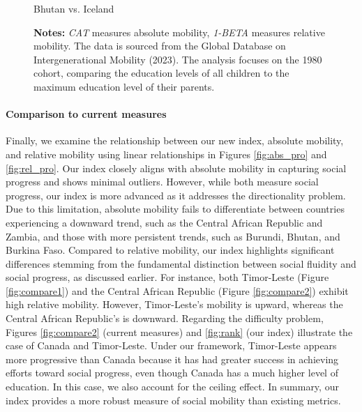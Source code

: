 \begin{figure}[H]
    \centering
    \caption{Bhutan vs. Iceland}
    \label{fig:compare3}
    \captionsetup{font=footnotesize}
    \caption*{\textbf{Notes:} \textit{CAT} measures absolute mobility, \textit{1-BETA} measures relative mobility. The data is sourced from the Global Database on Intergenerational Mobility (2023). The analysis focuses on the 1980 cohort, comparing the education levels of all children to the maximum education level of their parents.}
\end{figure}

\paragraph{Comparison to current measures}
Finally, we examine the relationship between our new index, absolute mobility, and relative mobility using linear relationships in Figures \ref{fig:abs_pro} and \ref{fig:rel_pro}. Our index closely aligns with absolute mobility in capturing social progress and shows minimal outliers. However, while both measure social progress, our index is more advanced as it addresses the directionality problem. Due to this limitation, absolute mobility fails to differentiate between countries experiencing a downward trend, such as the Central African Republic and Zambia, and those with more persistent trends, such as Burundi, Bhutan, and Burkina Faso. Compared to relative mobility, our index highlights significant differences stemming from the fundamental distinction between social fluidity and social progress, as discussed earlier. For instance, both Timor-Leste (Figure \ref{fig:compare1}) and the Central African Republic (Figure \ref{fig:compare2}) exhibit high relative mobility. However, Timor-Leste’s mobility is upward, whereas the Central African Republic’s is downward. Regarding the difficulty problem, Figures \ref{fig:compare2} (current measures) and \ref{fig:rank} (our index) illustrate the case of Canada and Timor-Leste. Under our framework, Timor-Leste appears more progressive than Canada because it has had greater success in achieving efforts toward social progress, even though Canada has a much higher level of education. In this case, we also account for the ceiling effect. In summary, our index provides a more robust measure of social mobility than existing metrics.

